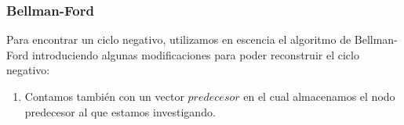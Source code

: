 \subsubsection{Bellman-Ford}
Para encontrar un ciclo negativo, utilizamos en escencia el algoritmo de Bellman-Ford introduciendo algunas
modificaciones para poder reconstruir el ciclo negativo:

\begin{enumerate}
\item Contamos tambi\'en con un vector $predecesor$ en el cual almacenamos el nodo predecesor al que
estamos investigando.
\end{enumerate}
